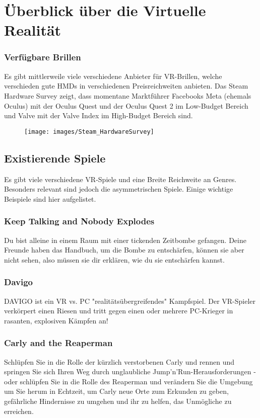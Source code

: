 \chapter{Überblick über die Virtuelle Realität}


\subsection{Verfügbare Brillen}
Es gibt mittlerweile viele verschiedene Anbieter für VR-Brillen, welche verschieden gute HMDs in verschiedenen Preisreichweiten anbieten.
Das Steam Hardware Survey zeigt, dass momentane Marktführer Facebooks Meta (ehemals Oculus) mit der Oculus Quest und der Oculus Quest 2 im Low-Budget Bereich und Valve mit der Valve Index im High-Budget Bereich sind.


\begin{figure}[h]
	\centering
	\texttt{[image: images/Steam\_HardwareSurvey]}
	\caption{\cite{_steam_hardware}}
\end{figure}

\section{Existierende Spiele}
Es gibt viele verschiedene VR-Spiele und eine Breite Reichweite an Genres. Besonders relevant sind jedoch die asymmetrischen Spiele. Einige wichtige Beispiele sind hier aufgelistet.

\subsection{Keep Talking and Nobody Explodes}
Du bist alleine in einem Raum mit einer tickenden Zeitbombe gefangen. Deine Freunde haben das Handbuch, um die Bombe zu entschärfen, können sie aber nicht sehen, also müssen sie dir erklären, wie du sie entschärfen kannst.

\subsection{Davigo}
DAVIGO ist ein VR vs. PC "realitätsübergreifendes" Kampfspiel. Der VR-Spieler verkörpert einen Riesen und tritt gegen einen oder mehrere PC-Krieger in rasanten, explosiven Kämpfen an!

\subsection{Carly and the Reaperman}
Schlüpfen Sie in die Rolle der kürzlich verstorbenen Carly und rennen und springen Sie sich Ihren Weg durch unglaubliche Jump'n'Run-Herausforderungen - oder schlüpfen Sie in die Rolle des Reaperman und verändern Sie die Umgebung um Sie herum in Echtzeit, um Carly neue Orte zum Erkunden zu geben, gefährliche Hindernisse zu umgehen und ihr zu helfen, das Unmögliche zu erreichen.

